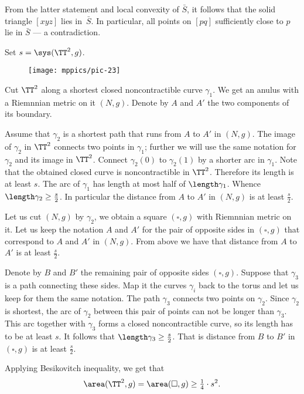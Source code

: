 From the latter statement and local convexity of $\bar S$, 
it follows that the solid triangle $[xyz]$ lies in~$\bar S$.
In particular, all points on $[pq]$ sufficiently close to $p$ lie in $\bar S$ --- a contradiction.

Set $s=\sys(\TT^2,g)$.

\begin{wrapfigure}{r}{45 mm}
\vskip-4mm
\centering
\texttt{[image: mppics/pic-23]}
\end{wrapfigure}

Cut $\TT^2$ along a shortest closed noncontractible curve $\gamma_1$.
We get an anulus with a Riemnnian metric on it $(N,g)$.
Denote by $A$ and $A'$ the two components of its boundary.


Assume that $\gamma_2$ is a shortest path that runs from $A$ to $A'$ in $(N,g)$.
The image of $\gamma_2$ in $\TT^2$ connects two points in $\gamma_1$;
further we will use the same notation for $\gamma_2$ and its image in $\TT^2$.
Connect $\gamma_2(0)$ to $\gamma_2(1)$ by a shorter arc in $\gamma_1$.
Note that the obtained closed curve is noncontractible in $\TT^2$.
Therefore its length is at least $s$.
The arc of $\gamma_1$ has length at most half of $\length\gamma_1$.
Whence $\length \gamma_2\ge \tfrac s2$.
In particular the distance from $A$ to $A'$ in $(N,g)$ is at least $\tfrac s2$.

Let us cut $(N,g)$ by $\gamma_2$, we obtain a square $(\square,g)$ with Riemnnian metric on it.
Let us keep the notation $A$ and $A'$ for the pair of opposite sides in $(\square,g)$ that correspond to $A$ and $A'$ in $(N,g)$.
From above we have that distance from $A$ to $A'$ is at least $\tfrac s2$.

Denote by $B$ and $B'$ the remaining pair of opposite sides $(\square,g)$.
Suppose that $\gamma_3$ is a path connecting these sides.
Map it the curves $\gamma_i$ back to the torus and let us keep for them the same notation.
The path $\gamma_3$ connects two points on $\gamma_2$.
Since $\gamma_2$ is shortest, the arc of $\gamma_2$ between this pair of points can not be longer than $\gamma_3$.
This arc together with $\gamma_3$ forms a closed noncontractible curve, so its length has to be at least $s$.
It follows that $\length\gamma_3\ge \tfrac s2$.
That is distance from $B$ to $B'$ in  $(\square,g)$ is at least $\tfrac s2$.

Applying Besikovitch inequality, we get that 
\[\area(\TT^2,g)=\area(\square,g)\ge \tfrac14\cdot s^2.\]

